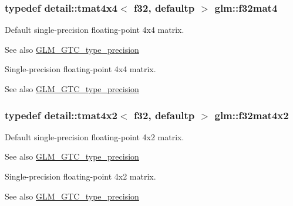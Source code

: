 \subsubsection[{\texorpdfstring{f32mat4}{f32mat4}}]{\setlength{\rightskip}{0pt plus 5cm}typedef detail\+::tmat4x4$<$ f32, defaultp $>$ {\bf glm\+::f32mat4}}\hypertarget{group__gtc__type__precision_ga6bf98d2ab0eb4889e5190c26e1853292}{}\label{group__gtc__type__precision_ga6bf98d2ab0eb4889e5190c26e1853292}
Default single-\/precision floating-\/point 4x4 matrix. \begin{DoxySeeAlso}{See also}
\hyperlink{group__gtc__type__precision}{G\+L\+M\+\_\+\+G\+T\+C\+\_\+type\+\_\+precision}
\end{DoxySeeAlso}
Single-\/precision floating-\/point 4x4 matrix. \begin{DoxySeeAlso}{See also}
\hyperlink{group__gtc__type__precision}{G\+L\+M\+\_\+\+G\+T\+C\+\_\+type\+\_\+precision} 
\end{DoxySeeAlso}
\subsubsection[{\texorpdfstring{f32mat4x2}{f32mat4x2}}]{\setlength{\rightskip}{0pt plus 5cm}typedef detail\+::tmat4x2$<$ f32, defaultp $>$ {\bf glm\+::f32mat4x2}}\hypertarget{group__gtc__type__precision_ga6aee56c6561190811699bfd2b1cd0d57}{}\label{group__gtc__type__precision_ga6aee56c6561190811699bfd2b1cd0d57}
Default single-\/precision floating-\/point 4x2 matrix. \begin{DoxySeeAlso}{See also}
\hyperlink{group__gtc__type__precision}{G\+L\+M\+\_\+\+G\+T\+C\+\_\+type\+\_\+precision}
\end{DoxySeeAlso}
Single-\/precision floating-\/point 4x2 matrix. \begin{DoxySeeAlso}{See also}
\hyperlink{group__gtc__type__precision}{G\+L\+M\+\_\+\+G\+T\+C\+\_\+type\+\_\+precision} 
\end{DoxySeeAlso}

